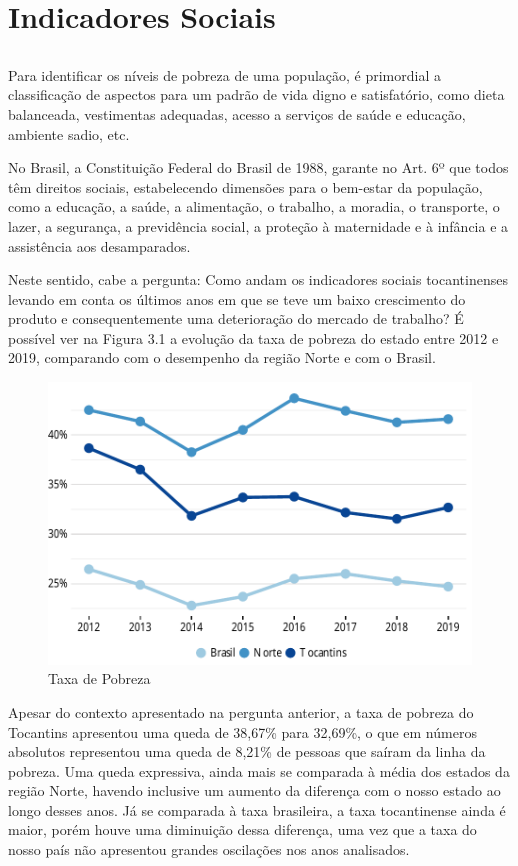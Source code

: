 \chapter{Indicadores Sociais}
\section{}
\par Para identificar os níveis de pobreza de uma população, é primordial a classificação de aspectos para um padrão de vida digno e satisfatório, como dieta balanceada, vestimentas adequadas, acesso a serviços de saúde e educação, ambiente sadio, etc.
\par No Brasil, a Constituição Federal do Brasil de 1988, garante no Art. 6º que todos têm direitos sociais, estabelecendo dimensões para o bem-estar da população, como a educação, a saúde, a alimentação, o trabalho, a moradia, o transporte, o lazer, a segurança, a previdência social, a proteção à maternidade e à infância e a assistência aos desamparados.
\par Neste sentido, cabe a pergunta: Como andam os indicadores sociais tocantinenses levando em conta os últimos anos em que se teve um baixo crescimento do produto e consequentemente uma deterioração do mercado de trabalho? É possível ver na Figura 3.1 a evolução da taxa de pobreza do estado entre 2012 e 2019, comparando com o desempenho da região Norte e com o Brasil.
\begin{figure}[h]
	\caption{Taxa de Pobreza}
	\includegraphics{fig/taxa_pobreza.pdf}
\end{figure}
\par Apesar do contexto apresentado na pergunta anterior, a taxa de pobreza do Tocantins apresentou uma queda de 38,67\% para 32,69\%, o que em números absolutos representou uma queda de 8,21\% de pessoas que saíram da linha da pobreza. Uma queda expressiva, ainda mais se comparada à média dos estados da região Norte, havendo inclusive um aumento da diferença com o nosso estado ao longo desses anos. Já se comparada à taxa brasileira, a taxa tocantinense ainda é maior, porém houve uma diminuição dessa diferença, uma vez que a taxa do nosso país não apresentou grandes oscilações nos anos analisados.

